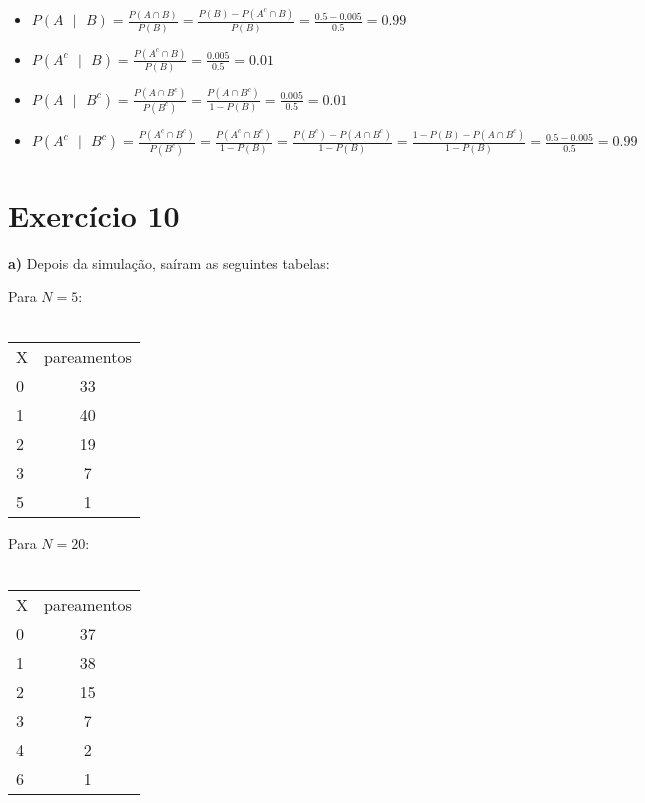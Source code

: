 \documentclass[12pt,letterpaper]{article}
\begin{document}
	\begin{itemize}
		\item $P(A\text{ }|\text{ }B) = \frac{P(A \cap B)}{P(B)} = \frac{P(B) - P(A^c \cap B)}{P(B)} = \frac{0.5 -0.005}{0.5} = 0.99$
		\item $P(A^c\text{ }|\text{ }B) = \frac{P(A^c \cap B)}{P(B)} = \frac{0.005}{0.5} = 0.01$
		\item $P(A\text{ }|\text{ }B^c) = \frac{P(A \cap B^c)}{P(B^c)} = \frac{P(A \cap B^c)}{1 - P(B)} = \frac{0.005}{0.5} = 0.01$
		\item $P(A^c\text{ }|\text{ }B^c) = \frac{P(A^c \cap B^c)}{P(B^c)} = \frac{P(A^c \cap B^c)}{1 - P(B)} = \frac{P(B^c) - P(A \cap B^c)}{1 - P(B)} = \frac{1 - P(B) - P(A \cap B^c)}{1 - P(B)} = \frac{0.5 - 0.005}{0.5} = 0.99$
	\end{itemize}
	
	\section*{Exercício 10}
	
	\textbf{a)} Depois da simulação, saíram as seguintes tabelas:
	
	\begin{multicols}{2}
		Para $N = 5$:\\\\
		\begin{tabular}{|l|c|}
			\cline{1-2}
			X & pareamentos  \\ \cline{1-2}
			0 & 33 \\ 
			1 & 40 \\ 
			2 & 19 \\ 
			3 & 7  \\ 
			5 & 1  \\ \cline{1-2}
		\end{tabular}
		
		Para $N = 20$:\\\\
		\begin{tabular}{|l|c|}
			\cline{1-2}
			X & pareamentos  \\ \cline{1-2}
			0 & 37 \\ 
			1 & 38 \\ 
			2 & 15 \\
			3 & 7  \\
			4 & 2  \\
			6 & 1  \\ \cline{1-2}
		\end{tabular}
	\end{multicols}
	
\end{document}
